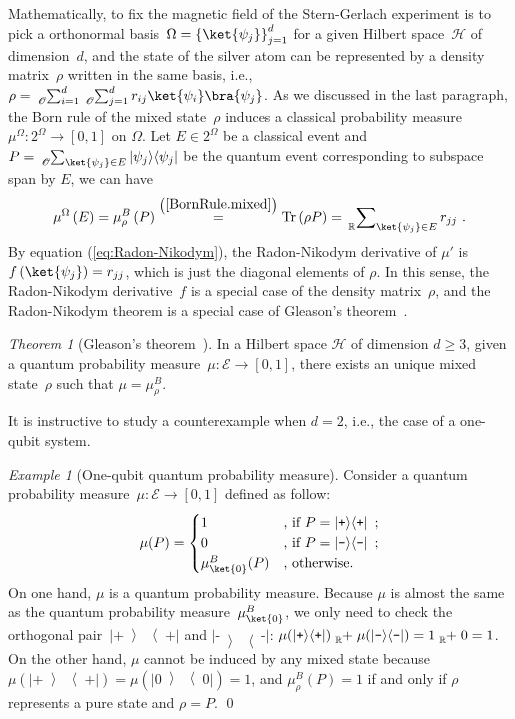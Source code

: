 \documentclass{article}
\theoremstyle{remark}
\newtheorem{example}{Example}
\newtheorem{thm}{Theorem}
\newcommand{\events}{\ensuremath{\mathcal{E}}}
\newcommand{\pmeas}{\ensuremath{\mu}}
\newcommand{\Hilb}{\mathcal{H}}
\newcommand{\ps}{\texttt{+}}
\newcommand{\ms}{\texttt{-}}
\newcommand{\Tr}{\mathop{\mathrm{Tr}}\nolimits}
\newcommand{\op}[2]{\ensuremath{\left\vert{#1}\middle\rangle\middle\langle{#2}\right\vert}}
\newcommand{\proj}[1]{\op{#1}{#1}}
\begin{document}
Mathematically, to fix the magnetic field of the Stern-Gerlach experiment
is to pick a orthonormal basis~$\Omega=\left\{ \ket{\psi_{j}}\right\} _{j=1}^{d}$
for a given Hilbert space~$\Hilb$ of dimension~$d$, and the state
of the silver atom can be represented by a density matrix~$\rho$
written in the same basis, i.e., $\rho=\tensor*[_{\mathscr{O}}]{\sum}{_{i=1}^{d}}\tensor*[_{\mathscr{O}}]{\sum}{_{j=1}^{d}}r_{ij}\ket{\psi_{i}}\bra{\psi_{j}}$.
As we discussed in the last paragraph, the Born rule of the mixed
state~$\rho$ induces a classical probability measure~$\pmeas^{\Omega}:2^{\Omega}\rightarrow[0,1]$
on $\Omega$. Let $E\in2^{\Omega}$ be a classical event and $P=\tensor*[_{\mathscr{O}}]{\sum}{_{\ket{\psi_{j}}\in E}}\proj{\psi_{j}}$
be the quantum event corresponding to subspace span by $E$, we can
have
\begin{equation}
\pmeas^{\Omega}\left(E\right)=\mu_{\rho}^{B}\left(P\right)\overset{\left(\ref{BornRule.mixed}\right)}{=}\Tr\left(\rho P\right)=\sideset{_{\mathbb{R}}}{_{\ket{\psi_{j}}\in E}}\sum r_{jj}\textrm{ .}\label{BornRule.mixed-1}
\end{equation}
By equation (\ref{eq:Radon-Nikodym}), the Radon-Nikodym derivative
of $\pmeas'$ is $f\left(\ket{\psi_{j}}\right)=r_{jj}$, which is
just the diagonal elements of $\rho$. In this sense, the Radon-Nikodym
derivative~$f$ is a special case of the density matrix~$\rho$,
and the Radon-Nikodym theorem is a special case of Gleason's theorem~\cite{HollandJr1970,Redhead1987-REDINA,Jaeger2007}.

\begin{thm}[Gleason's theorem~\cite{gleason1957,Redhead1987-REDINA,peres1995quantum}]\label{cor:Gleason's}In
a Hilbert space $\Hilb$ of dimension $d\geq3$, given a quantum probability
measure~$\mu:\events\rightarrow[0,1]$, there exists an unique mixed
state~$\rho$ such that $\mu=\mu_{\rho}^{B}$.\end{thm}

It is instructive to study a counterexample when $d=2$, i.e., the
case of a one-qubit system.

\begin{example}[One-qubit quantum probability measure] Consider
a quantum probability measure~$\mu:\events\rightarrow[0,1]$ defined
as follow: 
\[
\mu(P)=\begin{cases}
1 & \textrm{, if }P=\proj{\ps}\textrm{ ;}\\
0 & \textrm{, if }P=\proj{\ms}\textrm{ ;}\\
\mu_{\ket{0}}^{B}(P) & \textrm{, otherwise.}
\end{cases}
\]
On one hand, $\mu$ is a quantum probability measure. Because $\mu$
is almost the same as the quantum probability measure~$\mu_{\ket{0}}^{B}$,
we only need to check the orthogonal pair~$\proj{\ps}$ and $\proj{\ms}$:
$\mu(\proj{\ps})\tensor*[_{\mathbb{R}}]{+}{}\mu(\proj{\ms})=1\tensor*[_{\mathbb{R}}]{+}{}0=1$.
On the other hand, $\mu$ cannot be induced by any mixed state because
$\mu(\proj{\ps})=\mu(\proj{0})=1$, and $\mu_{\rho}^{B}(P)=1$ if
and only if $\rho$ represents a pure state and $\rho=P$. \qed\end{example}
\end{document}
